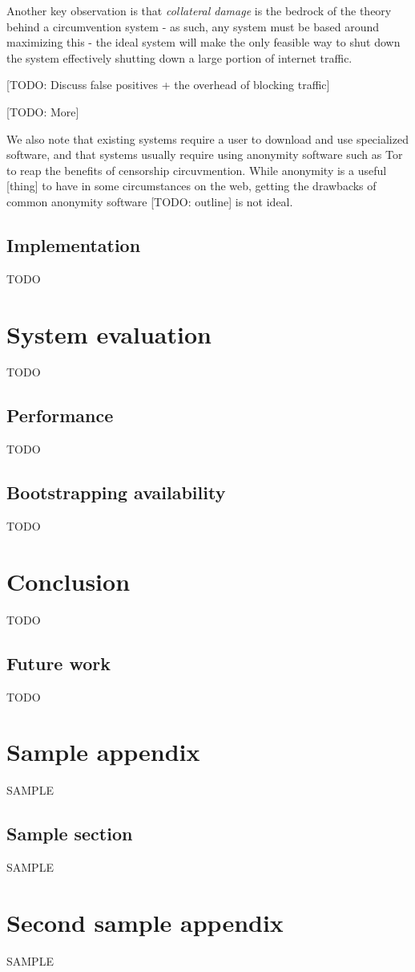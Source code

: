 \documentclass[12pt]{report}
\begin{document}
Another key observation is that \emph{collateral damage} is the bedrock of the theory behind a circumvention system - as such, any system must be based around maximizing this - the ideal system will make the only feasible way to shut down the system effectively shutting down a large portion of internet traffic. 

[TODO: Discuss false positives + the overhead of blocking traffic]

[TODO: More]

We also note that existing systems require a user to download and use specialized software, and that systems usually require using anonymity software such as Tor to reap the benefits of censorship circuvmention. While anonymity is a useful [thing] to have in some circumstances on the web, getting the drawbacks of common anonymity software [TODO: outline] is not ideal.

\section{Implementation}

TODO

\chapter{System evaluation}

TODO

\section{Performance}

TODO

\section{Bootstrapping availability}

TODO

\chapter{Conclusion}

TODO

\section{Future work}

TODO

\appendices  %

\chapter{Sample appendix}
SAMPLE
\section{Sample section}
SAMPLE

\chapter{Second sample appendix}
SAMPLE




\end{document}
